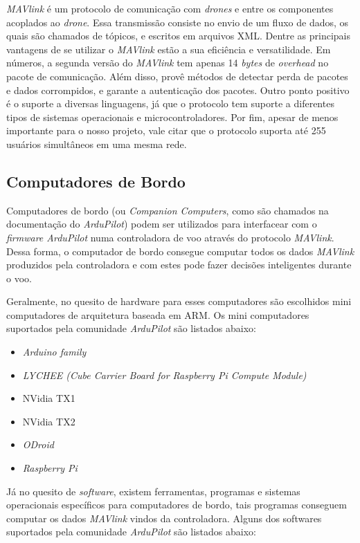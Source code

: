 \documentclass[12pt,a4paper,oneside]{book}
\begin{document}
\textit{MAVlink} é um protocolo de comunicação com \textit{drones} e entre os componentes acoplados ao \textit{drone}. Essa transmissão consiste no envio de um fluxo de dados, os quais são chamados de tópicos, e escritos em arquivos XML. Dentre as principais vantagens de se utilizar o \textit{MAVlink} estão a sua eficiência e versatilidade. Em números, a segunda versão do \textit{MAVlink} tem apenas 14 \textit{bytes} de \textit{overhead} no pacote de comunicação. Além disso, provê métodos de detectar perda de pacotes e dados corrompidos, e garante a autenticação dos pacotes. Outro ponto positivo é o suporte a diversas linguagens, já que o protocolo tem suporte a diferentes tipos de sistemas operacionais e microcontroladores. Por fim, apesar de menos importante para o nosso projeto, vale citar que o protocolo suporta até 255 usuários simultâneos em uma mesma rede.
\cite{MAVlink}

\subsection{Computadores de Bordo}

Computadores de bordo (ou \textit{Companion Computers}, como são chamados na documentação do \textit{ArduPilot}) podem ser utilizados para interfacear com o \textit{firmware ArduPilot} numa controladora de voo através do protocolo \textit{MAVlink}. Dessa forma, o computador de bordo consegue computar todos os dados \textit{MAVlink} produzidos pela controladora e com estes pode fazer decisões inteligentes durante o voo. 

Geralmente, no quesito de hardware para esses computadores são escolhidos mini computadores de arquitetura baseada em ARM. Os mini computadores suportados pela comunidade \textit{ArduPilot} são listados abaixo:

\begin{itemize}
  \item \textit{Arduino family}
  \item \textit{LYCHEE (Cube Carrier Board for Raspberry Pi Compute Module)}
  \item NVidia TX1
  \item NVidia TX2
  \item \textit{ODroid}
  \item \textit{Raspberry Pi}
\end{itemize}

Já no quesito de \textit{software}, existem ferramentas, programas e sistemas operacionais específicos para computadores de bordo, tais programas conseguem computar os dados \textit{MAVlink} vindos da controladora. Alguns dos softwares suportados pela comunidade \textit{ArduPilot} são listados abaixo:
\end{document}
